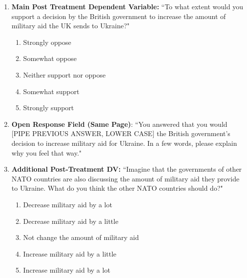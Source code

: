 \begin{appendices}
\begin{enumerate}
\begin{enumerate}
        \paragraph{}
        Meanwhile, in his second term as President of the United States, Donald Trump will also likely reevaluate how best to end the war. Imagine that President Trump announces plans to cut American military aid for Ukraine in order to put a stop to the fighting and create lasting peace and stability in Europe.
    \end{enumerate}
    \item \textbf{Main Post Treatment Dependent Variable:} ``To what extent would you support a decision by the British government to increase the amount of military aid the UK sends to Ukraine?" 
    \begin{enumerate}
            \item Strongly oppose
            \item Somewhat oppose
            \item Neither support nor oppose
            \item Somewhat support
            \item Strongly support
        \end{enumerate}
    \item \textbf{Open Response Field (Same Page)}: ``You answered that you would [PIPE PREVIOUS ANSWER, LOWER CASE] the British government's decision to increase military aid for Ukraine. In a few words, please explain why you feel that way."
    \item \textbf{Additional Post-Treatment DV:} ``Imagine that the governments of other NATO countries are also discussing the amount of military aid they provide to Ukraine. What do you think the other NATO countries should do?"
    \begin{enumerate}
        \item Decrease military aid by a lot
        \item Decrease military aid by a little
        \item  Not change the amount of military aid 
        \item Increase military aid by a little
        \item Increase military aid by a lot 


\end{enumerate}
\end{enumerate}
\end{appendices}
